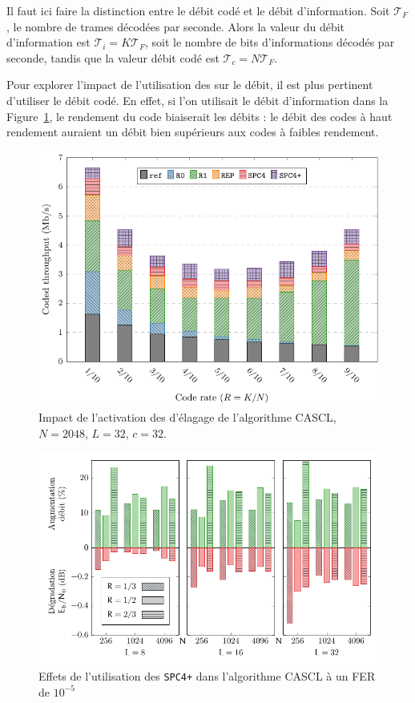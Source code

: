 Il faut ici faire la distinction entre le débit codé et le débit d'information. Soit $\mathcal{T}_F$, le nombre de trames décodées par seconde. Alors la valeur du débit d'information est $\mathcal{T}_i=K\mathcal{T}_F$, soit le nombre de bits d'informations décodés par seconde, tandis que la valeur débit codé est $\mathcal{T}_c=N\mathcal{T}_F$.

Pour explorer l'impact de l'utilisation des \noeuds sur le débit, il est  plus pertinent d'utiliser le débit codé. En effet, si l'on utilisait le débit d'information dans la Figure~\ref{fig:nodes}, le rendement du code biaiserait les débits : le débit des codes à haut rendement auraient un débit bien supérieurs aux codes à faibles rendement.
\begin{figure}[t]
\includegraphics[width=\textwidth]{main/ch2_fig/curves/tree/tikz/tree}
\caption{Impact de l'activation des \noeuds d'élagage de l'algorithme CASCL, $N=2048$, $L=32$, $c=32$.}
\label{fig:nodes}
\end{figure}

\begin{figure}[t]
\includegraphics[width=\textwidth]{main/ch2_fig/curves/thr_spc/tikz/thr_spc_diff}
\caption{Effets de l'utilisation des \noeuds \texttt{SPC4+} dans l'algorithme CASCL à un FER de $10^{-5}$}
\label{fig:spc_impact}
\end{figure}

